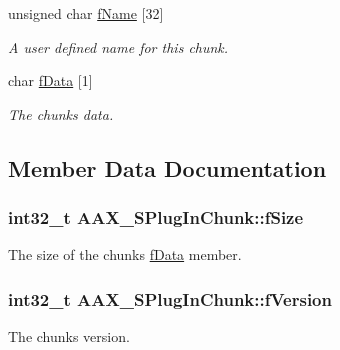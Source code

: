 \begin{DoxyCompactItemize}
unsigned char \hyperlink{a00125_a1b07e29358b5549739f674e04653a6bc}{f\+Name} \mbox{[}32\mbox{]}
\begin{DoxyCompactList}\small\item\em A user defined name for this chunk. \end{DoxyCompactList}\item 
char \hyperlink{a00125_abc76d66fffa4a59ee5cfdbdd992c532c}{f\+Data} \mbox{[}1\mbox{]}
\begin{DoxyCompactList}\small\item\em The chunk\textquotesingle{}s data. \end{DoxyCompactList}\end{DoxyCompactItemize}


\subsection{Member Data Documentation}
\hypertarget{a00125_ac08f37f1ed50eac8ac3ca4bf5494c84d}{}
\subsubsection[{f\+Size}]{\setlength{\rightskip}{0pt plus 5cm}int32\+\_\+t A\+A\+X\+\_\+\+S\+Plug\+In\+Chunk\+::f\+Size}\label{a00125_ac08f37f1ed50eac8ac3ca4bf5494c84d}


The size of the chunk\textquotesingle{}s \hyperlink{a00125_abc76d66fffa4a59ee5cfdbdd992c532c}{f\+Data} member. 

\hypertarget{a00125_ac114fd94e7b12c235f9c18bcbbc46f06}{}
\subsubsection[{f\+Version}]{\setlength{\rightskip}{0pt plus 5cm}int32\+\_\+t A\+A\+X\+\_\+\+S\+Plug\+In\+Chunk\+::f\+Version}\label{a00125_ac114fd94e7b12c235f9c18bcbbc46f06}


The chunk\textquotesingle{}s version. 

\hypertarget{a00125_a88197dbb1057c5035370943550a3284e}{}
